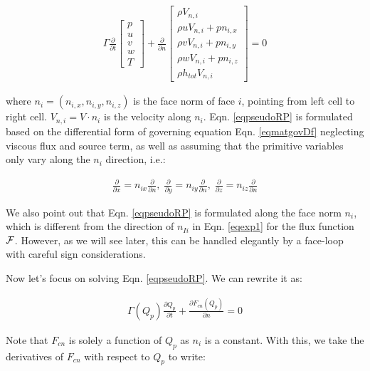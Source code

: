 \documentclass[12pt, letterpaper]{report}
\begin{document}
\begin{align}\label{eqpseudoRP}
   \Gamma \frac{\partial }{\partial t} \begin{bmatrix}p \\ u \\ v \\ w \\ T\end{bmatrix}+
   \frac{\partial }{\partial n} \begin{bmatrix}\rho V_{n,i} \\ \rho u V_{n,i} + p n_{i,x} \\ \rho v
   V_{n,i} + p n_{i,y} \\ \rho w V_{n,i} + p n_{i,z} \\ \rho h_{tot}V_{n,i} \end{bmatrix} = 0
\end{align}

where $n_i = (n_{i,x}, n_{i,y}, n_{i,z})$ is the face norm of face $i$, pointing from left cell to
right cell. $V_{n,i} = V \cdot n_i$ is the velocity along $n_i$. Eqn. \ref{eqpseudoRP} is
formulated based on the differential form of governing equation Eqn. \ref{eqmatgovDf} neglecting
viscous flux and source term, as well as assuming that the primitive variables only vary along the
$n_i$ direction, i.e.:

\begin{align*}
   \frac{\partial }{\partial x} = n_{ix} \frac{\partial }{\partial n}, \; 
   \frac{\partial }{\partial y} = n_{iy} \frac{\partial }{\partial n}, \;
   \frac{\partial }{\partial z} = n_{iz} \frac{\partial }{\partial n}
\end{align*}

We also point out that Eqn. \ref{eqpseudoRP} is formulated along the face norm $n_i$, which is
different from the direction of $n_{Ii}$ in Eqn. \ref{eqexp1} for the flux function $\mathcal{F}$. However,
as we will see later, this can be handled elegantly by a face-loop with careful sign considerations.
\paraspace

Now let's focus on solving Eqn. \ref{eqpseudoRP}. We can rewrite it as:

\begin{align*}
   \Gamma(Q_p) \frac{\partial Q_p}{\partial t} + \frac{\partial F_{cn}(Q_p)}{\partial n} = 0
\end{align*}

Note that $F_{cn}$ is solely a function of $Q_p$ as $n_i$ is a constant. With this, we take the
derivatives of $F_{cn}$ with respect to $Q_p$ to write:
\end{document}
